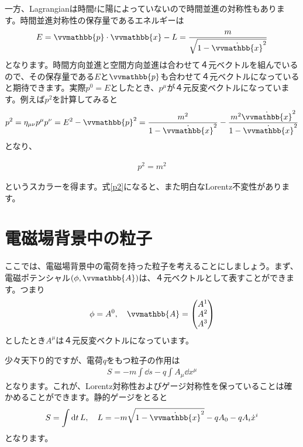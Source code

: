 \documentclass[report,paper=a4, fontsize=12pt, line_length=16cm, number_of_lines=33,dvipdfmx]{jlreq}
\newenvironment{important}{\begin{tcolorbox}[
  colback = white,
  colframe = red!35,
  boxrule = 2mm,
  fonttitle = \bfseries,
  after = \noindent] }{\end{tcolorbox}}
\numberwithin{equation}{chapter}
\newcommand{\xb}{\vvmathbb{x}}
\newcommand{\pbb}{\vvmathbb{p}}
\newcommand{\Ab}{\vvmathbb{A}}
\begin{document}
一方、Lagrangianは時間$t$に陽によっていないので時間並進の対称性もあります。時間並進対称性の保存量であるエネルギーは
\begin{align}
  E=\pbb\cdot \xb-L=\frac{m}{\sqrt{1-\dot{\xb}^2}}
\end{align}
となります。時間方向並進と空間方向並進は合わせて４元ベクトルを組んでいるので、その保存量である$E$と$\pbb$も合わせて４元ベクトルになっていると期待できます。実際$p^0=E$としたとき、$p^{\mu}$が４元反変ベクトルになっています。例えば$p^2$を計算してみると
\begin{align}
  p^2=\eta_{\mu\nu}p^{\mu}p^{\nu}=E^2-\pbb^2
=\frac{m^2}{1-\dot{\xb}^2}-\frac{m^2\dot{\xb}^2}{1-\dot{\xb}^2}
\end{align}
となり、
\begin{important}
  \begin{align}
    p^2=m^2\label{p2}
  \end{align}  
\end{important}
というスカラーを得ます。式\eqref{p2}になると、また明白なLorentz不変性があります。

\section{電磁場背景中の粒子}
ここでは、電磁場背景中の電荷を持った粒子を考えることにしましょう。まず、電磁ポテンシャル$(\phi, \Ab)$は、４元ベクトルとして表すことができます。つまり
\begin{align}
  \phi=A^0,\quad \Ab=\mqty(A^1 \\ A^2 \\ A^3)
\end{align}
としたとき$A^{\mu}$は４元反変ベクトルになっています。

少々天下り的ですが、電荷$q$をもつ粒子の作用は
\begin{align}
  S=-m\int \dd{s}-q\int A_{\mu}\dd{x}^{\mu}
\end{align}
となります。これが、Lorentz対称性およびゲージ対称性を保っていることは確かめることができます。静的ゲージをとると
\begin{align}
  S=\int \dd{t}L,\quad
  L=-m\sqrt{1-\dot{\xb}^2}-qA_{0}-qA_{i}\dot{x}^{i}
  \label{emstaticgauge}
\end{align}
となります。
\end{document}
